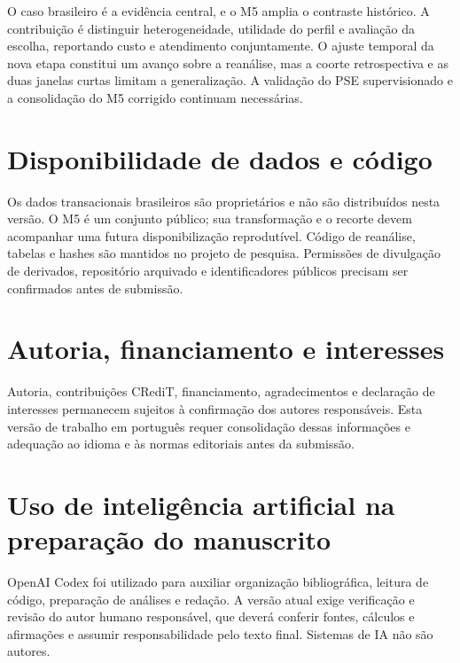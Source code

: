 \documentclass[preprint,12pt]{elsarticle}
\begin{document}
O caso brasileiro é a evidência central, e o M5 amplia o contraste histórico. A contribuição é distinguir heterogeneidade, utilidade do perfil e avaliação da escolha, reportando custo e atendimento conjuntamente. O ajuste temporal da nova etapa constitui um avanço sobre a reanálise, mas a coorte retrospectiva e as duas janelas curtas limitam a generalização. A validação do PSE supervisionado e a consolidação do M5 corrigido continuam necessárias.

\section*{Disponibilidade de dados e código}
Os dados transacionais brasileiros são proprietários e não são distribuídos nesta versão. O M5 é um conjunto público; sua transformação e o recorte devem acompanhar uma futura disponibilização reprodutível. Código de reanálise, tabelas e hashes são mantidos no projeto de pesquisa. Permissões de divulgação de derivados, repositório arquivado e identificadores públicos precisam ser confirmados antes de submissão.
\section*{Autoria, financiamento e interesses}
Autoria, contribuições CRediT, financiamento, agradecimentos e declaração de interesses permanecem sujeitos à confirmação dos autores responsáveis. Esta versão de trabalho em português requer consolidação dessas informações e adequação ao idioma e às normas editoriais antes da submissão.
\section*{Uso de inteligência artificial na preparação do manuscrito}
OpenAI Codex foi utilizado para auxiliar organização bibliográfica, leitura de código, preparação de análises e redação. A versão atual exige verificação e revisão do autor humano responsável, que deverá conferir fontes, cálculos e afirmações e assumir responsabilidade pelo texto final. Sistemas de IA não são autores.


\end{document}
